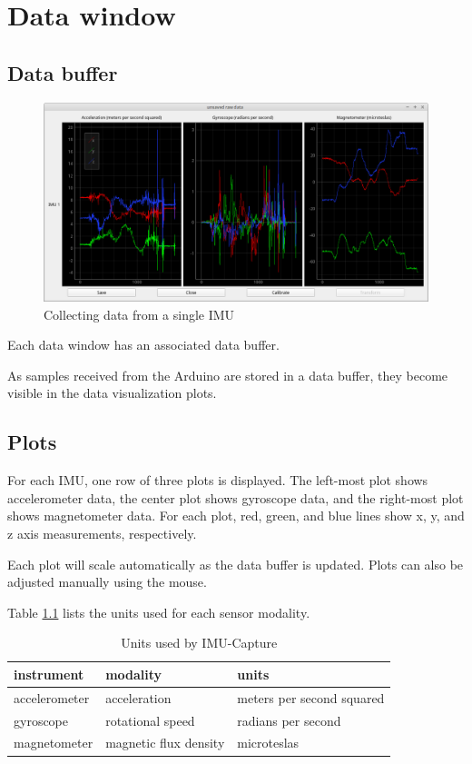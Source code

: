 \documentclass[11pt,letterpaper,article,oneside]{memoir}
\newcommand{\name}{IMU-Capture}
\begin{document}
\chapter{Data window}

\section{Data buffer}

\begin{figure}[]
    \begin{center}
        \includegraphics[width=\textwidth]{data_window}
    \end{center}
    \caption{Collecting data from a single IMU} 
\end{figure}

Each data window has an associated data buffer.

As samples received from the Arduino are stored in a data buffer, they
become visible in the data visualization plots.

\section{Plots}

For each IMU, one row of three
plots is displayed. The left-most plot shows accelerometer data, the center plot
shows gyroscope data, and the right-most plot shows magnetometer data. For each
plot, red, green, and blue lines show x, y, and z axis measurements,
respectively.


Each plot will scale automatically as the data buffer is updated. Plots can also
be adjusted manually using the mouse.


Table \ref{tab:units} lists the units used for each sensor modality.

\begin{table}
\centering
\begin{tabular}{@{}*3l@{}}
\toprule
instrument & modality & units \\
\midrule 
accelerometer & acceleration          & meters per second squared \\
gyroscope     & rotational speed      & radians per second\\
magnetometer  & magnetic flux density & microteslas \\
\bottomrule
\end{tabular}
\caption{Units used by \name{}}
\label{tab:units}
\end{table}
\end{document}

